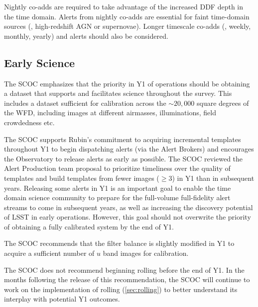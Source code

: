 Nightly co-adds are required to take advantage of the increased DDF depth in the time domain. Alerts from nightly co-adds are essential for faint time-domain sources (\eg , high-redshift AGN or supernovae). Longer timescale co-adds (\eg , weekly, monthly, yearly) and alerts should also be considered.





\FloatBarrier

\subsection{Early Science}\label{sec:early}

 The SCOC emphasizes that the priority in Y1 of operations should be obtaining a dataset that supports and facilitates science throughout the survey. This includes a dataset sufficient for calibration across the $\sim 20,000$ square degrees of the WFD, including images at different airmasses, illuminations, field crowdedness etc. 
 
 The SCOC supports Rubin's commitment to acquiring incremental templates throughout Y1 to begin dispatching alerts (via the Alert Brokers) and encourages the Observatory to release alerts as early as possible. The SCOC reviewed the Alert Production team proposal to prioritize timeliness over the quality of templates and build templates from fewer images ($\geq 3$) in Y1 than in subsequent years. Releasing some alerts in Y1 is an important goal to enable the time domain science community to prepare for the full-volume full-fidelity alert streams to come in subsequent years, as well as increasing the discovery potential of LSST in early operations. However, this goal should not overwrite the priority of obtaining a fully calibrated system by the end of Y1.

 The SCOC recommends that the filter balance is slightly modified in Y1 to acquire a sufficient number of $u$ band images for calibration. 

 The SCOC does not recommend beginning rolling before the end of Y1. In the months following the release of this recommendation, the SCOC will continue to work on the implementation of rolling (\autoref{sec:rolling}) to better understand its interplay with potential Y1 outcomes. 


\FloatBarrier



